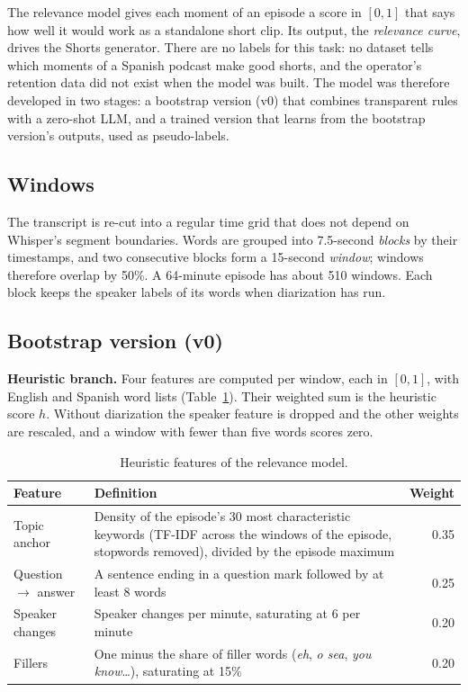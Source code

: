 The relevance model gives each moment of an episode a score in $[0,1]$ that says how well it would work as a standalone short clip. Its output, the \textit{relevance curve}, drives the Shorts generator. There are no labels for this task: no dataset tells which moments of a Spanish podcast make good shorts, and the operator's retention data did not exist when the model was built. The model was therefore developed in two stages: a bootstrap version (v0) that combines transparent rules with a zero-shot LLM, and a trained version that learns from the bootstrap version's outputs, used as pseudo-labels.

\subsection*{Windows}

The transcript is re-cut into a regular time grid that does not depend on Whisper's segment boundaries. Words are grouped into 7.5-second \textit{blocks} by their timestamps, and two consecutive blocks form a 15-second \textit{window}; windows therefore overlap by 50\%. A 64-minute episode has about 510 windows. Each block keeps the speaker labels of its words when diarization has run.

\subsection*{Bootstrap version (v0)}

\textbf{Heuristic branch.} Four features are computed per window, each in $[0,1]$, with English and Spanish word lists (Table~\ref{tab:relevance-features}). Their weighted sum is the heuristic score $h$. Without diarization the speaker feature is dropped and the other weights are rescaled, and a window with fewer than five words scores zero.

\begin{table}[H]
\centering
\caption{Heuristic features of the relevance model.}
\label{tab:relevance-features}
\small
\begin{tabular}{@{}p{3.6cm}p{9.2cm}r@{}}
\toprule
\textbf{Feature} & \textbf{Definition} & \textbf{Weight} \\
\midrule
Topic anchor & Density of the episode's 30 most characteristic keywords (TF-IDF across the windows of the episode, stopwords removed), divided by the episode maximum & 0.35 \\
Question $\rightarrow$ answer & A sentence ending in a question mark followed by at least 8 words & 0.25 \\
Speaker changes & Speaker changes per minute, saturating at 6 per minute & 0.20 \\
Fillers & One minus the share of filler words (\textit{eh}, \textit{o sea}, \textit{you know}\ldots), saturating at 15\% & 0.20 \\
\bottomrule
\end{tabular}
\end{table}

